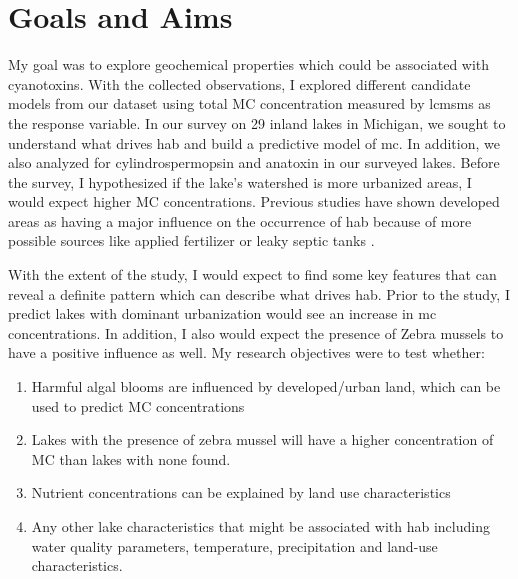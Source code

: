  \section{Goals and Aims}
My goal was to explore geochemical properties which could be associated with cyanotoxins.  With the collected observations, I explored different candidate models from our dataset using total MC concentration measured by \gls{lcmsms} as the response variable. In our survey on 29 inland lakes in Michigan, we sought to understand what drives \gls{hab} and build a predictive model of \gls{mc}. In addition, we also analyzed for cylindrospermopsin and anatoxin in our surveyed lakes. Before the survey, I hypothesized if the lake's watershed is more urbanized areas, I would expect higher MC concentrations.  Previous studies have shown developed areas as having a major influence on the occurrence of \gls{hab} because of more possible sources like applied fertilizer or leaky septic tanks \cite{beaver_land_2014, anderson_harmful_2002}.  %

With the extent of the study, I would expect to find some key features that can reveal a definite pattern which can describe what drives \gls{hab}. Prior to the study, I predict lakes with dominant urbanization would see an increase in \gls{mc} concentrations. In addition, I also would expect the presence of Zebra mussels to have a positive influence as well. My research objectives were to test whether:

\begin{enumerate}
 \item Harmful algal blooms are influenced by  developed/urban land, which can be used to predict MC concentrations
 \item Lakes with the presence of zebra mussel will have a higher concentration of MC than lakes with none found.
 \item Nutrient concentrations can be explained by land use characteristics
 \item Any other lake characteristics that might be associated with \gls{hab} including water quality parameters, temperature, precipitation and land-use characteristics.

\end{enumerate}
